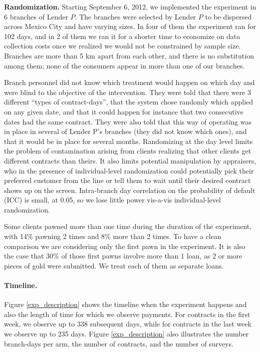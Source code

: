 \documentclass[oneside,11pt]{article}
\begin{document}
\vspace{.2in}
\noindent \textbf{Randomization.}  Starting September 6, 2012, we implemented the experiment in 6 branches of Lender $P$. The branches were selected by Lender $P$ to be dispersed across Mexico City and have varying sizes. In four of them the experiment ran for 102 days, and in 2 of them we ran it for a shorter time to economize on data collection costs once we realized we would not be constrained by sample size. %
Branches are more than 5 km apart from each other, and there is no substitution among them; none of the consumers appear in more than one of our branches.

Branch personnel did not know which treatment would happen on which day and were blind to the objective of the intervention. They were told that there were 3 different ``types of contract-days'', that the system chose randomly which applied on any given date, and that it could happen for instance that two consecutive dates had the same contract. They were also told that this way of operating was in place in several of Lender P's branches (they did not know which ones), and that it would be in place for several months. Randomizing at the day level limits the problem of contamination arising from clients realizing that other clients get different contracts than theirs. It also limits potential manipulation by appraisers, who in the presence of individual-level randomization could potentially pick their preferred customer from the line or tell them to wait until their desired contract shows up on the screen. Intra-branch day correlation on the probability of default (ICC) is small, at {0.05}, so we lose little power vis-a-vis individual-level randomization.



Some clients pawned more than one time during the duration of the experiment, with 14\% pawning 2 times and 8\% more than 2 times. To have a clean comparison we are considering only the first pawn in the experiment. It is also the case that 30\% of those first pawns involve more than 1 loan, as 2 or more pieces of gold were submitted. We treat each of them as separate loans.


\paragraph{Timeline.} Figure \ref{exp_description} shows the timeline when the experiment happens and also the length of time for which we observe payments. For contracts in the first week, we observe up to 338 subsequent days, while for contracts in the last week we observe up to 235 days. Figure \ref{exp_description} also illustrates the number branch-days per arm, the number of contracts, and the number of surveys. %
\end{document}
